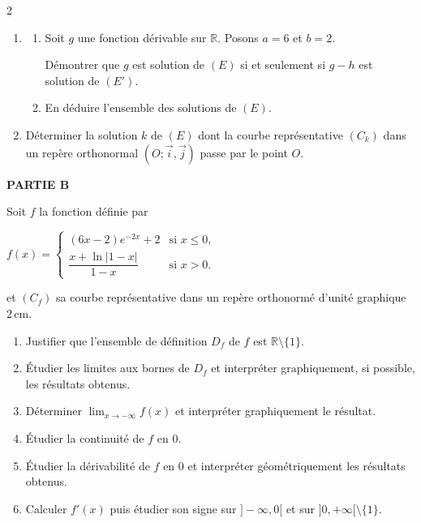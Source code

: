 \documentclass[12pt,a4paper]{article}
\begin{document}
\begin{multicols}{2}
\begin{enumerate}
Déterminer $a$ et $b$ pour que $h$ soit une solution de $(E)$.

\item 
\begin{enumerate}
\item Soit $g$ une fonction dérivable sur $\mathbb{R}$. Posons $a=6$ et $b=2$.

Démontrer que $g$ est solution de $(E)$ si et seulement si $g-h$ est solution de $(E')$.

\item En déduire l’ensemble des solutions de $(E)$.
\end{enumerate}

\item Déterminer la solution $k$ de $(E)$ dont la courbe représentative $(C_k)$ dans un repère orthonormal $(O;\vec{i},\vec{j})$ passe par le point $O$.
\end{enumerate}

\textbf{PARTIE B}

Soit $f$ la fonction définie par

\(
f(x)=
\begin{cases}
(6x-2)e^{-2x}+2 & \text{si } x\le 0,\\[0.3cm]
\dfrac{x+\ln|1-x|}{1-x} & \text{si } x>0.
\end{cases}
\)

et $(C_f)$ sa courbe représentative dans un repère orthonormé d’unité graphique \(2\,\text{cm}\).

\begin{enumerate}
\item Justifier que l’ensemble de définition $D_f$ de $f$ est \( \mathbb{R}\setminus\{1\} \).

\item Étudier les limites aux bornes de $D_f$ et interpréter graphiquement, si possible, les résultats obtenus.

\item Déterminer \( \lim_{x\to-\infty} f(x) \) et interpréter graphiquement le résultat.

\item Étudier la continuité de $f$ en $0$.

\item Étudier la dérivabilité de $f$ en $0$ et interpréter géométriquement les résultats obtenus.

\item Calculer $f'(x)$ puis étudier son signe sur \( ]-\infty,0[ \) et sur \( ]0,+\infty[\setminus\{1\} \).


\end{enumerate}
\end{multicols}
\end{document}
